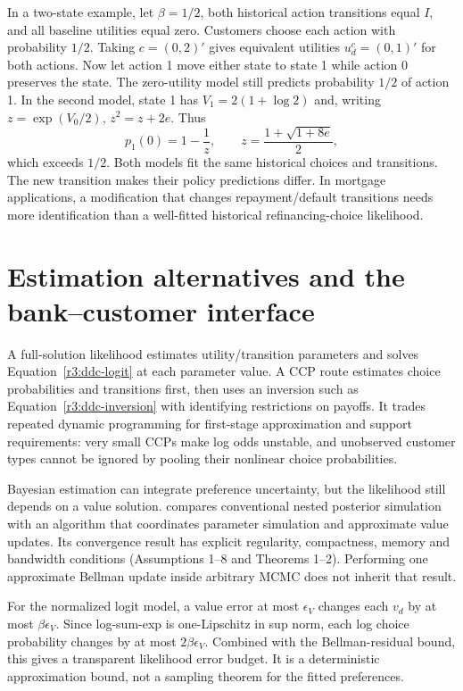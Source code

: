 In a two-state example, let $\beta=1/2$, both historical action
transitions equal $I$, and all baseline utilities equal zero. Customers
choose each action with probability $1/2$. Taking $c=(0,2)'$ gives
equivalent utilities $u_d^c=(0,1)'$ for both actions. Now let action
1 move either state to state 1 while action 0 preserves the state.
The zero-utility model still predicts probability $1/2$ of action 1.
In the second model, state 1 has
$V_1=2(1+\log2)$ and, writing $z=\exp(V_0/2)$,
$z^2=z+2e$. Thus
\[
 p_1(0)=1-\frac{1}{z},\qquad
 z=\frac{1+\sqrt{1+8e}}2,
\]
which exceeds $1/2$. Both models fit the same historical choices and
transitions. The new transition makes their policy predictions differ.
In mortgage applications, a modification that changes repayment/default
transitions needs more identification than a well-fitted historical
refinancing-choice likelihood.

\section{Estimation alternatives and the bank--customer interface}
\label{r3:choice-estimation}
A full-solution likelihood estimates utility/transition parameters and
solves Equation~\eqref{r3:ddc-logit} at each parameter value. A CCP
route estimates choice probabilities and transitions first, then uses
an inversion such as Equation~\eqref{r3:ddc-inversion} with identifying
restrictions on payoffs. It trades repeated dynamic programming for
first-stage approximation and support requirements: very small CCPs
make log odds unstable, and unobserved customer types cannot be ignored
by pooling their nonlinear choice probabilities.

Bayesian estimation can integrate preference uncertainty, but the
likelihood still depends on a value solution. \citet[Sections 2.2--2.3]{imai2009}
compares conventional nested posterior simulation with an algorithm
that coordinates parameter simulation and approximate value updates.
Its convergence result has explicit regularity, compactness, memory
and bandwidth conditions (Assumptions 1--8 and Theorems 1--2).
Performing one approximate Bellman update inside arbitrary MCMC does
not inherit that result.

For the normalized logit model, a value error at most $\epsilon_V$
changes each $v_d$ by at most $\beta\epsilon_V$. Since log-sum-exp
is one-Lipschitz in sup norm, each log choice probability changes by
at most $2\beta\epsilon_V$. Combined with the Bellman-residual bound,
this gives a transparent likelihood error budget. It is a deterministic
approximation bound, not a sampling theorem for the fitted preferences.

